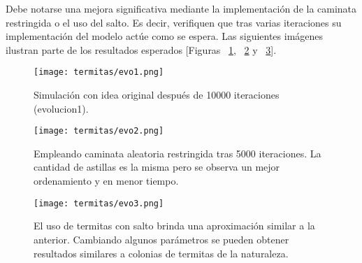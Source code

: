 Debe notarse una mejora significativa mediante la implementación de la caminata restringida o el uso del salto. Es decir, verifiquen que tras varias iteraciones su implementación del modelo actúe como se espera. Las siguientes imágenes ilustran parte de los resultados esperados [Figuras ~\ref{fig:evo1}, ~\ref{fig:evo2} y ~\ref{fig:evo3}].

\begin{figure}
  \centering
  \texttt{[image: termitas/evo1.png]}
  \caption{Simulación con idea original después de 10000 iteraciones (evolucion1).}
  \label{fig:evo1}
\end{figure}

\begin{figure}
  \centering
  \texttt{[image: termitas/evo2.png]}
  \caption{Empleando caminata aleatoria restringida tras 5000 iteraciones. La cantidad de astillas es la misma pero se observa un mejor ordenamiento y en menor tiempo.}
  \label{fig:evo2}
\end{figure}

\begin{figure}
  \centering
  \texttt{[image: termitas/evo3.png]}
  \caption{El uso de termitas con salto brinda una aproximación similar a la anterior. Cambiando algunos parámetros se pueden obtener resultados similares a colonias de termitas de la naturaleza.}
  \label{fig:evo3}
\end{figure}






